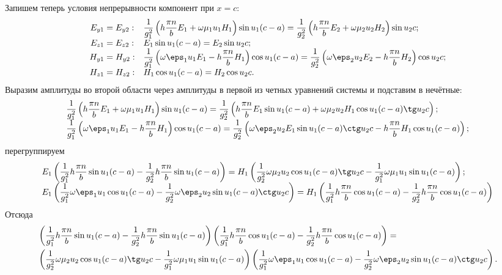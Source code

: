 \documentclass[12pt]{hedsemwork}
\renewcommand{\frac}{\dfrac}
\begin{document}
Запишем теперь условия непрерывности компонент при \( x = c \):
\[
\begin{array}{cl}
    E_{y1} = E_{y2}: &
    \frac{1}{g_1^2} \left(h \frac{\pi n}{b} E_1 + \omega\mu_1u_1H_1\right)
    \sin u_1 (c-a) =  \frac{1}{g_2^2}
    \left(h \frac{\pi n}{b} E_2 + \omega\mu_2u_2H_2\right)
    \sin u_2 c ;\\
    E_{z1} = E_{z2}: & E_1\sin u_1 (c-a) = E_2\sin u_2 c; \\
    H_{y1} = H_{y2}: &
    \frac{1}{g_1^2}\left(\omega\eps_1u_1E_1-h \frac{\pi n}{b} H_1\right)
    \cos u_1 (c-a) = \frac{1}{g_2^2}
    \left(\omega\eps_2u_2E_2-h \frac{\pi n}{b} H_2\right)\cos u_2 c ;\\
    H_{z1} = H_{z2}: & H_1\cos u_1 (c-a) = H_2\cos u_2 c.\\
\end{array}
\]
Выразим амплитуды во второй области через амплитуды в первой из четных уравнений
системы и подставим в нечётные:
\[
\begin{array}{l}
    \frac{1}{g_1^2} \left(h \frac{\pi n}{b} E_1 + \omega\mu_1u_1H_1\right)
    \sin u_1 (c-a) =  \frac{1}{g_2^2}
    \left(h \frac{\pi n}{b} E_1 \sin u_1(c-a) +
    \omega\mu_2u_2H_1\cos u_1 (c-a) \tg u_2 c \right) ;\\
    \frac{1}{g_1^2}\left(\omega\eps_1u_1E_1-h \frac{\pi n}{b} H_1\right)
    \cos u_1 (c-a) = \frac{1}{g_2^2}
    \left(\omega\eps_2u_2E_1\sin u_1(c-a)\ctg u_2 c-
    h \frac{\pi n}{b} H_1\cos u_1 (c-a)\right) ;\\
\end{array}
\]
перегруппируем
\[
\begin{array}{l}
    E_1\left(\frac{1}{g_1^2} h \frac{\pi n}{b}\sin u_1 (c-a) -
    \frac{1}{g_2^2}h \frac{\pi n}{b}\sin u_1(c-a)\right) =
    H_1\left(\frac{1}{g_2^2}\omega\mu_2u_2\cos u_1 (c-a) \tg u_2 c-
    \frac{1}{g_1^2}\omega\mu_1u_1\sin u_1 (c-a)\right);\\
    E_1\left(\frac{1}{g_1^2}\omega\eps_1u_1\cos u_1 (c-a)-
    \frac{1}{g_2^2}\omega\eps_2u_2\sin u_1(c-a)\ctg u_2 c\right)=
    H_1\left(\frac{1}{g_1^2}h \frac{\pi n}{b} \cos u_1 (c-a)-
    \frac{1}{g_2^2}h \frac{\pi n}{b} \cos u_1 (c-a)\right)
\end{array}
\]
Отсюда
\begin{align*}
    &\left(\frac{1}{g_1^2} h \frac{\pi n}{b}\sin u_1 (c-a) -
    \frac{1}{g_2^2}h \frac{\pi n}{b}\sin u_1(c-a)\right)\left(\frac{1}{g_1^2}h \frac{\pi n}{b} \cos u_1 (c-a)-
    \frac{1}{g_2^2}h \frac{\pi n}{b} \cos u_1 (c-a)\right) =\\
    & \left(\frac{1}{g_2^2}\omega\mu_2u_2\cos u_1 (c-a) \tg u_2 c-
    \frac{1}{g_1^2}\omega\mu_1u_1\sin u_1 (c-a)\right)
    \left(\frac{1}{g_1^2}\omega\eps_1u_1\cos u_1 (c-a)-
    \frac{1}{g_2^2}\omega\eps_2u_2\sin u_1(c-a)\ctg u_2 c\right).
\end{align*}
\end{document}
